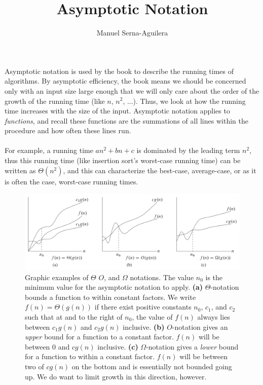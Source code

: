\documentclass{article}
\title{Asymptotic Notation}
\author{Manuel Serna-Aguilera}
\date{}
\begin{document}
\maketitle
Asymptotic notation is used by the book to describe the running times of algorithms. By asymptotic efficiency, the book means we should be concerned only with an input size large enough that we will only care about the order of the growth of the running time (like $n$, $n^2$, ...). Thus, we look at how the running time increases with the size of the input. Asymptotic notation applies to \textit{functions}, and recall these functions are the summations of all lines within the procedure and how often these lines run. 
\\ \\
For example, a running time $an^2 + bn + c$ is dominated by the leading term $n^2$, thus this running time (like insertion sort's worst-case running time) can be written as $\Theta{(n^2)}$, and this can characterize the best-case, average-case, or as it is often the case, worst-case running times.

\begin{figure}[ht]
\centering
\includegraphics[scale=0.35]{asymptotic_notation}
\caption{
    Graphic examples of $\Theta$ $O$, and $\Omega$ notations. The value $n_0$ is the minimum value for the asymptotic notation to apply.
    \textbf{(a)} $\Theta$-notation bounds a function to within constant factors. We write $f(n)=\Theta{(g(n))}$ if there exist positive constants $n_0$, $c_1$, and $c_2$ such that at and to the right of $n_0$, the value of $f(n)$ always lies between $c_1g(n)$ and $c_2g(n)$ inclusive.
    \textbf{(b)} $O$-notation gives an \textit{upper} bound for a function to a constant factor. $f(n)$ will be between 0 and $cg(n)$ inclusive.
    \textbf{(c)} $\Omega$-notation gives a \textit{lower} bound for a function to within a constant factor. $f(n)$ will be between two of $cg(n)$ on the bottom and is essentially not bounded going up. We do want to limit growth in this direction, however.
}
\label{fig:asymptotic_notation}
\end{figure}
\end{document}
